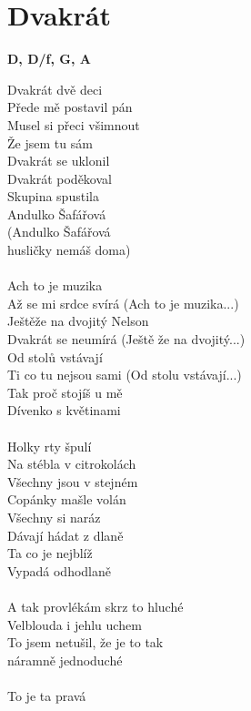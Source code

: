 \section{Dvakrát}
\footnotesize\textbf{D, D/f\kr , G, A}\\
\normalsize
\begin{multicols}{2}
Dvakrát dvě deci\\
Přede mě postavil pán\\
Musel si přeci všimnout\\
Že jsem tu sám\\
Dvakrát se uklonil\\
Dvakrát poděkoval\\
Skupina spustila\\
Andulko Šafářová\\
(Andulko Šafářová\\
husličky nemáš doma)\\
\\
Ach to je muzika\\
Až se mi srdce svírá (Ach to je muzika...)\\
Ještěže na dvojitý Nelson\\
Dvakrát se neumírá (Ještě že na dvojitý...)\\
Od stolů vstávají\\
Ti co tu nejsou sami (Od stolu vstávají...)\\
Tak proč stojíš u mě\\
Dívenko s květinami\\
\\
Holky rty špulí\\
Na stébla v citrokolách\\
Všechny jsou v stejném\\
Copánky mašle volán\\
Všechny si naráz\\
Dávají hádat z dlaně\\
Ta co je nejblíž\\
Vypadá odhodlaně\\
\\ 
A tak provlékám skrz to hluché\\
Velblouda i jehlu uchem\\
To jsem netušil, že je to tak\\
náramně jednoduché\\
\columnbreak
\\
To je ta pravá\\

\end{multicols}
